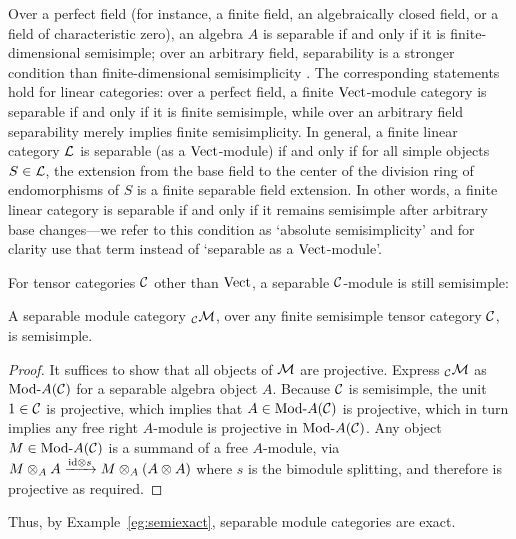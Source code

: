\documentclass{amsart}
\begin{document}
Over a perfect field (for instance, a finite field, an algebraically closed field, or a field of characteristic zero), an algebra $A$ is separable if and only if it is finite-dimensional semisimple; over an arbitrary field, separability is a stronger condition than finite-dimensional semisimplicity \cite[Ch.~2]{MR0280479}.  The corresponding statements hold for linear categories: over a perfect field, a finite $\mathrm{Vect}$-module category is separable if and only if it is finite semisimple, while over an arbitrary field separability merely implies finite semisimplicity.  %
In general, a finite linear category $\mathcal L$ is separable (as a $\mathrm{Vect}$-module) if and only if for all simple objects $S \in \mathcal L$, the extension from the base field to the center of the division ring of endomorphisms of $S$ is a finite separable field extension.  In other words, a finite linear category is separable if and only if it remains semisimple after arbitrary base changes---we refer to this condition as `absolute semisimplicity' and for clarity use that term instead of `separable as a $\mathrm{Vect}$-module'.  %

For tensor categories $\mathcal C$ other than $\mathrm{Vect}$, a separable $\mathcal C$-module is still semisimple:
\begin{proposition} \label{prop:sepmodissemi}
A separable module category ${}_\mathcal C \mathcal M$, over any finite semisimple tensor category $\mathcal C$, is semisimple.
\end{proposition}
\begin{proof}
It suffices to show that all objects of $\mathcal M$ are projective.  Express ${}_\mathcal C \mathcal M$ as $\Mod{}{A}(\cC)$ for a separable algebra object $A$.  Because $\mathcal C$ is semisimple, the unit $1 \in \mathcal C$ is projective, which implies that $A \in \Mod{}{A}(\cC)$ is projective, which in turn implies any free right $A$-module is projective in $\Mod{}{A}(\cC)$.  Any object $M \in \Mod{}{A}(\cC)$ is a summand of a free $A$-module, via $M \otimes_A A \xrightarrow{\mathrm{id} \otimes s} M \otimes_A (A \otimes A)$ where $s$ is the bimodule splitting, and therefore is projective as required.
\end{proof}
\noindent Thus, by Example~\ref{eg:semiexact}, separable module categories are exact.
\end{document}
